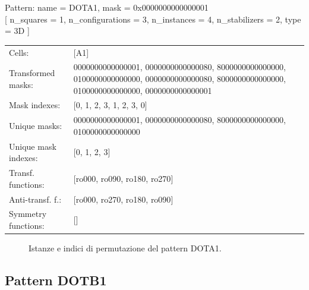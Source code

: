 \begin{tcolorbox}[sharp corners, fontupper=\ttfamily\small, colback=white]
  \noindent Pattern: name = DOTA1, mask = 0x0000000000000001\\
  {[} n\_squares = 1, n\_configurations = 3,
  n\_instances = 4, n\_stabilizers = 2, type = 3D { ]}\\[1.0ex]
  \begin{tabularx}{\textwidth}{@{} p{3.5cm} X @{}}
    Cells:               & {[}A1{]}\\[0.5ex]
    Transformed masks:   & 0000000000000001, 0000000000000080, 8000000000000000, 0100000000000000, 0000000000000080, 8000000000000000, 0100000000000000, 0000000000000001\\[0.5ex]
    Mask indexes:        & {[}0, 1, 2, 3, 1, 2, 3, 0{]}\\[0.5ex]
    Unique masks:        & 0000000000000001, 0000000000000080, 8000000000000000, 0100000000000000\\[0.5ex]
    Unique mask indexes: & {[}0, 1, 2, 3{]}\\[0.5ex]
    Transf. functions:   & {[}ro000, ro090, ro180, ro270{]}\\[0.5ex]
    Anti-transf. f.:     & {[}ro000, ro270, ro180, ro090{]}\\[0.5ex]
    Symmetry functions:  & {[}{]}\\[0.5ex]
  \end{tabularx}
\end{tcolorbox}

\begin{figure}[htbp]
  \centering
   \hfill
   \hfill
   \hfill
  \vspace{0.3cm}
   \hfill
   \hfill
   \hfill
  \caption{Istanze e indici di permutazione del pattern DOTA1.}
\end{figure}

\newpage

\subsection{Pattern DOTB1}

